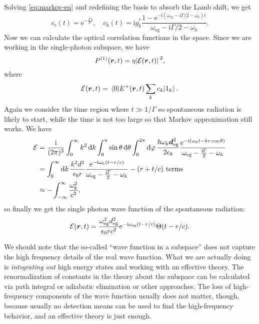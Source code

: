 \documentclass[hyperref, a4paper]{article}
\newcommand*{\ii}{\mathrm{i}}
\newcommand*{\ee}{\mathrm{e}}
\begin{document}
Solving \eqref{eq:markov-eq} and redefining the basis to absorb the Lamb shift, we get 
\begin{equation}
    c_\text{e}(t) = \ee^{- \frac{\Gamma}{2} t}, \quad 
    c_\text{k}(t) = \ii g_k^* \frac{1 - \ee^{- \ii (\omega_\text{eg} - \ii \Gamma / 2 - \omega_k) t}}{\omega_\text{eg} - \ii \Gamma / 2 - \omega_k} .
\end{equation}
Now we can calculate the optical correlation functions in the space. Since we are working in the single-photon 
subspace, we have 
\begin{equation}
    P^{(1)}(\vb*{r}, t) = \eta \abs*{\mathcal{E}(\vb*{r}, t)}^2,
\end{equation}
where 
\begin{equation}
    \mathcal{E}(\vb*{r}, t) = \mel{0}{E^+(\vb*{r}, t) \sum_k c_k }{1_k}.
\end{equation}
Again we consider the time region where $t \gg 1 / \Gamma$ so spontaneous radiation is likely to start, while the 
time is not too large so that Markov approximation still works. We have 
\[
    \begin{aligned}
        \mathcal{E} &= \frac{\ii}{(2\pi)^3} \int_0^\infty k^2 \dd{k} \int_0^\pi \sin \theta \dd{\theta}
        \int_0^{2\pi} \dd{\varphi} \frac{\hbar \omega_k \vb*{d}_\text{eg}^2}{2 \epsilon_0} 
        \frac{\ee^{- \ii (\omega_k t - k r \cos \theta)}}{ \omega_\text{eg} - \frac{\ii \Gamma}{2} - \omega_k} \\
        &= \int_0^\infty \dd{k} \frac{k^2 d^2}{\epsilon_0 r} \frac{\ee^{- \ii \omega_k (t - r / c)}}{\omega_\text{eg} - \frac{\ii \Gamma}{2} - \omega_k} - \text{$(r + t/c)$ terms} \\
        &\approx - \int_{-\infty}^\infty \frac{\omega_k^2}{c^2} ,
    \end{aligned}
\]
so finally we get the single photon wave function of the spontaneous radiation:
\begin{equation}
    \mathcal{E}(\vb*{r}, t) = \frac{\omega_\text{eg}^2 d_\text{eg}^2}{\epsilon_0 r c^2} 
    \ee^{- \ii \omega_\text{eg} (t - r / c)} \Theta(t - r/c).
\end{equation}

\begin{note*}{}{}
    We should note that the so-called ``wave function in a subspace'' does not capture the high frequency 
    details of the real wave function. What we are actually doing is \emph{integrating out} high energy 
    states and working with an effective theory. The renormalization of constants in the theory about 
    the subspace can be calculated via path integral or adiabatic elimination or other approaches.
    The loss of high-frequency components of the wave function usually does not matter, though, 
    because usually no detection means can be used to find the high-frequency behavior, and an effective
    theory is just enough.
\end{note*}
\end{document}
